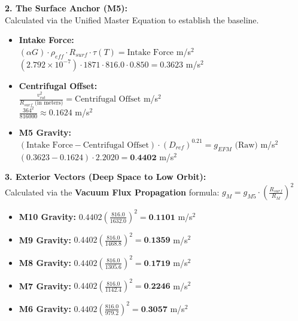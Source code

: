 \documentclass[11pt, a4paper]{article}
\begin{document}
  \vspace{1.0em}
  \noindent \textbf{2. The Surface Anchor (M5):} \\
  \hspace*{1em} Calculated via the Unified Master Equation to establish the baseline.
  \begin{itemize}
    \item \textbf{Intake Force:} \\[0.5em]
    \hspace*{2em} $(\alpha G) \cdot \rho_{eff} \cdot R_{surf} \cdot \tau(T) = \text{Intake Force}$ m/s$^2$ \\[1em]
    \hspace*{2em} $(2.792 \times 10^{-7}) \cdot 1871 \cdot 816.0 \cdot 0.850 = 0.3623$ m/s$^2$
    
    \item \textbf{Centrifugal Offset:} \\[0.5em]
    \hspace*{2em} $\frac{v_{rot}^2}{R_{surf} \text{ (in meters)}} = \text{Centrifugal Offset}$ m/s$^2$ \\[1em]
    \hspace*{2em} $\frac{364^2}{816000} \approx 0.1624$ m/s$^2$
    
    \item \textbf{M5 Gravity:} \\[0.5em]
    \hspace*{2em} $(\text{Intake Force} - \text{Centrifugal Offset}) \cdot (D_{ref})^{0.21} = g_{EFM} \text{ (Raw)}$ m/s$^2$ \\[1em]
    \hspace*{2em} $(0.3623 - 0.1624) \cdot 2.2020 = \textbf{0.4402}$ m/s$^2$
  \end{itemize}

  \clearpage
  \noindent \textbf{3. Exterior Vectors (Deep Space to Low Orbit):} \\
  \hspace*{1em} Calculated via the \textbf{Vacuum Flux Propagation} formula: $g_M = g_{M5} \cdot \left( \frac{R_{surf}}{R_M} \right)^2$
  \begin{itemize}
    \item \textbf{M10 Gravity:} $0.4402 \left( \frac{816.0}{1632.0} \right)^2 = \textbf{0.1101}$ m/s$^2$
    \item \textbf{M9 Gravity:} $0.4402 \left( \frac{816.0}{1468.8} \right)^2 = \textbf{0.1359}$ m/s$^2$
    \item \textbf{M8 Gravity:} $0.4402 \left( \frac{816.0}{1305.6} \right)^2 = \textbf{0.1719}$ m/s$^2$
    \item \textbf{M7 Gravity:} $0.4402 \left( \frac{816.0}{1142.4} \right)^2 = \textbf{0.2246}$ m/s$^2$
    \item \textbf{M6 Gravity:} $0.4402 \left( \frac{816.0}{979.2} \right)^2 = \textbf{0.3057}$ m/s$^2$
  \end{itemize}
\end{document}
